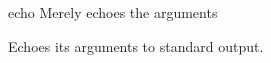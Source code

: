 \begin{nusmvCommand}{echo} {Merely echoes the arguments}


Echoes its arguments to standard output.
\end{nusmvCommand}
